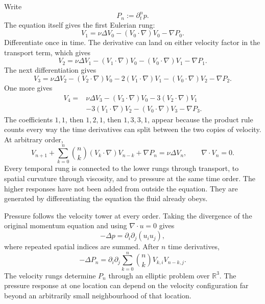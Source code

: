 
Write
\[
  P_n:=\partial_t^n p.
\]
The equation itself gives the first Eulerian rung:
\[
  V_1
  =
  \nu\Delta V_0
  -(V_0\cdot\nabla)V_0
  -\nabla P_0.
\]
Differentiate once in time.
The derivative can land on either velocity factor in the transport term, which gives
\[
  V_2
  =
  \nu\Delta V_1
  -(V_1\cdot\nabla)V_0
  -(V_0\cdot\nabla)V_1
  -\nabla P_1.
\]
The next differentiation gives
\[
  V_3
  =
  \nu\Delta V_2
  -(V_2\cdot\nabla)V_0
  -2(V_1\cdot\nabla)V_1
  -(V_0\cdot\nabla)V_2
  -\nabla P_2.
\]
One more gives
\[
  \begin{aligned}
  V_4
  ={}&
  \nu\Delta V_3
  -(V_3\cdot\nabla)V_0
  -3(V_2\cdot\nabla)V_1\\
  &-3(V_1\cdot\nabla)V_2
  -(V_0\cdot\nabla)V_3
  -\nabla P_3.
  \end{aligned}
\]
The coefficients \(1,1\), then \(1,2,1\), then \(1,3,3,1\), appear because the product rule counts every way the time derivatives can split between the two copies of velocity.
At arbitrary order,
\[
  V_{n+1}
  +
  \sum_{k=0}^{n}
  \binom{n}{k}
  (V_k\cdot\nabla)V_{n-k}
  +
  \nabla P_n
  =
  \nu\Delta V_n,
  \qquad
  \nabla\cdot V_n=0.
\]
Every temporal rung is connected to the lower rungs through transport, to spatial curvature through viscosity, and to pressure at the same time order.
The higher responses have not been added from outside the equation.
They are generated by differentiating the equation the fluid already obeys.


Pressure follows the velocity tower at every order.
Taking the divergence of the original momentum equation and using \(\nabla\cdot u=0\) gives
\[
  -\Delta p
  =
  \partial_i\partial_j(u_i u_j),
\]
where repeated spatial indices are summed.
After \(n\) time derivatives,
\[
  -\Delta P_n
  =
  \partial_i\partial_j
  \sum_{k=0}^{n}
  \binom{n}{k}
  V_{k,i}V_{n-k,j}.
\]
The velocity rungs determine \(P_n\) through an elliptic problem over \(\mathbb R^3\).
The pressure response at one location can depend on the velocity configuration far beyond an arbitrarily small neighbourhood of that location.

